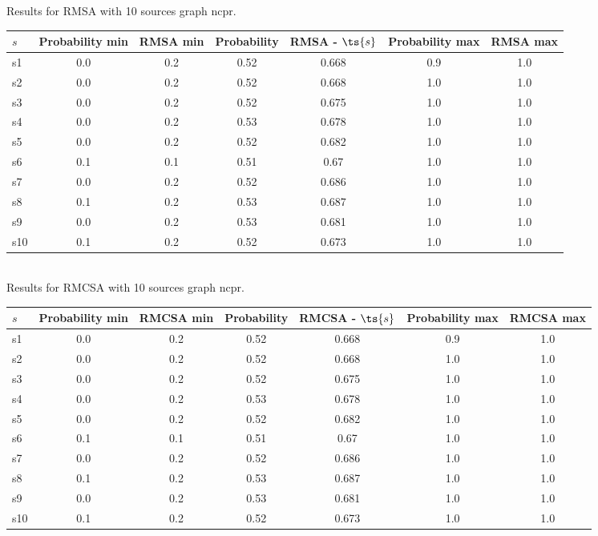 \documentclass{article}
\begin{document}
\noindent Results for RMSA with 10 sources graph ncpr.

\noindent\begin{tabular}{|l|c|c|c|c|c|c|}
\hline
$s$& Probability min & RMSA min & Probability & RMSA - $\ts{s}$ & Probability max & RMSA max\\
\hline
s1 &0.0 & 0.2 & 0.52 & 0.668 & 0.9 & 1.0\\
\hline
s2 &0.0 & 0.2 & 0.52 & 0.668 & 1.0 & 1.0\\
\hline
s3 &0.0 & 0.2 & 0.52 & 0.675 & 1.0 & 1.0\\
\hline
s4 &0.0 & 0.2 & 0.53 & 0.678 & 1.0 & 1.0\\
\hline
s5 &0.0 & 0.2 & 0.52 & 0.682 & 1.0 & 1.0\\
\hline
s6 &0.1 & 0.1 & 0.51 & 0.67 & 1.0 & 1.0\\
\hline
s7 &0.0 & 0.2 & 0.52 & 0.686 & 1.0 & 1.0\\
\hline
s8 &0.1 & 0.2 & 0.53 & 0.687 & 1.0 & 1.0\\
\hline
s9 &0.0 & 0.2 & 0.53 & 0.681 & 1.0 & 1.0\\
\hline
s10 &0.1 & 0.2 & 0.52 & 0.673 & 1.0 & 1.0\\
\hline
\end{tabular}\\

\noindent Results for RMCSA with 10 sources graph ncpr.

\noindent\begin{tabular}{|l|c|c|c|c|c|c|}
\hline
$s$& Probability min & RMCSA min & Probability & RMCSA - $\ts{s}$ & Probability max & RMCSA max\\
\hline
s1 &0.0 & 0.2 & 0.52 & 0.668 & 0.9 & 1.0\\
\hline
s2 &0.0 & 0.2 & 0.52 & 0.668 & 1.0 & 1.0\\
\hline
s3 &0.0 & 0.2 & 0.52 & 0.675 & 1.0 & 1.0\\
\hline
s4 &0.0 & 0.2 & 0.53 & 0.678 & 1.0 & 1.0\\
\hline
s5 &0.0 & 0.2 & 0.52 & 0.682 & 1.0 & 1.0\\
\hline
s6 &0.1 & 0.1 & 0.51 & 0.67 & 1.0 & 1.0\\
\hline
s7 &0.0 & 0.2 & 0.52 & 0.686 & 1.0 & 1.0\\
\hline
s8 &0.1 & 0.2 & 0.53 & 0.687 & 1.0 & 1.0\\
\hline
s9 &0.0 & 0.2 & 0.53 & 0.681 & 1.0 & 1.0\\
\hline
s10 &0.1 & 0.2 & 0.52 & 0.673 & 1.0 & 1.0\\
\hline
\end{tabular}\\
\end{document}
